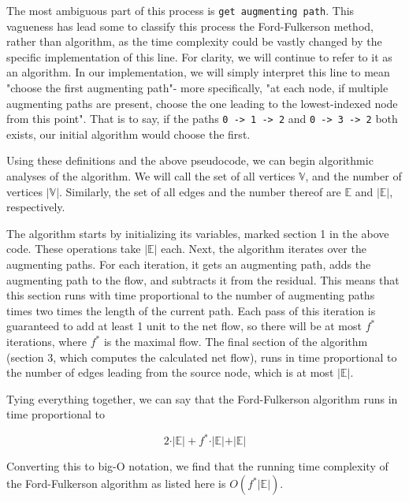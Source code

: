\documentclass[12pt]{amsart}
\begin{document}
    The most ambiguous part of this process is
    \verb|get augmenting path|. This vagueness has lead some to
    classify this process the Ford-Fulkerson method, rather than
    algorithm, as the time complexity could be vastly changed by
    the specific implementation of this line. For clarity, we
    will continue to refer to it as an algorithm. In our
    implementation, we will simply interpret this line to mean
    "choose the first augmenting path"- more specifically, 
    "at each node, if multiple augmenting paths are present,
    choose the one leading to the lowest-indexed node from this
    point". That is to say, if the paths \verb|0 -> 1 -> 2| and
    \verb|0 -> 3 -> 2| both exists, our initial algorithm would
    choose the first.

    Using these definitions and the above pseudocode, we can
    begin algorithmic analyses of the algorithm. We will call
    the set of all vertices $\mathbb{V}$, and the number of
    vertices $\vert \mathbb{V} \vert$. Similarly, the set of all
    edges and the number thereof are $\mathbb{E}$ and
    $\vert \mathbb{E} \vert$, respectively.
    
    The algorithm starts by initializing its variables, marked
    section 1 in the above code. These operations take
    $\vert \mathbb{E} \vert$ each. Next, the algorithm iterates
    over the augmenting paths. For each iteration, it gets an
    augmenting path, adds the augmenting path to the flow, and
    subtracts it from the residual. This means that this section
    runs with time proportional to the number of augmenting
    paths times two times the length of the current path. Each
    pass of this iteration is guaranteed to add at least 1 unit
    to the net flow, so there will be at most $f^*$ iterations,
    where $f^*$ is the maximal flow. The final section of the
    algorithm (section 3, which computes the calculated net
    flow), runs in time proportional to the number of edges
    leading from the source node, which is at most
    $\vert \mathbb{E} \vert$.

    Tying everything together, we can say that the
    Ford-Fulkerson algorithm runs in time proportional to

\[
    2 \cdot \vert \mathbb{E} \vert + f^* \cdot \vert \mathbb{E}
        \vert + \vert \mathbb{E} \vert
\]

    Converting this to big-O notation, we find that the running
    time complexity of the Ford-Fulkerson algorithm as listed
    here is $O(f^* \vert \mathbb{E} \vert )$.
\end{document}
